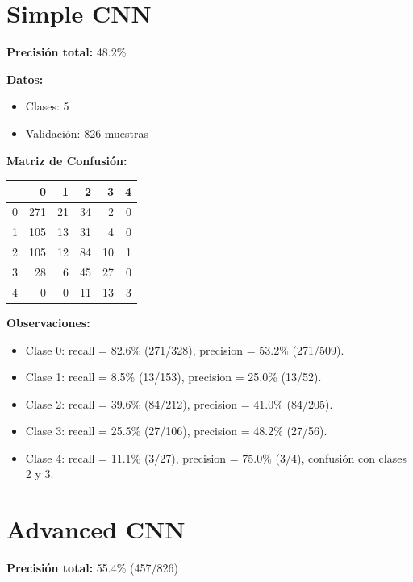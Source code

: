 \documentclass[11pt,spanish,listoffigures,listoftables]{tfgetsinf}
\begin{document}
\section{Simple CNN}

\textbf{Precisión total:} 48.2\%

\bigskip

\noindent\textbf{Datos:}
\begin{itemize}
  \item Clases: 5
  \item Validación: 826 muestras
\end{itemize}

\medskip

\noindent\textbf{Matriz de Confusión:}
\begin{tabular}{lrrrrr}
    & 0   & 1   & 2   & 3   & 4   \\ \hline
  0 & 271 & 21  & 34  & 2   & 0   \\
  1 & 105 & 13  & 31  & 4   & 0   \\
  2 & 105 & 12  & 84  & 10  & 1   \\
  3 & 28  & 6   & 45  & 27  & 0   \\
  4 & 0   & 0   & 11  & 13  & 3   
\end{tabular}

\bigskip

\noindent\textbf{Observaciones:}
\begin{itemize}
  \item Clase 0: recall = 82.6\% (271/328), precision = 53.2\% (271/509).
  \item Clase 1: recall = 8.5\% (13/153), precision = 25.0\% (13/52).
  \item Clase 2: recall = 39.6\% (84/212), precision = 41.0\% (84/205).
  \item Clase 3: recall = 25.5\% (27/106), precision = 48.2\% (27/56).
  \item Clase 4: recall = 11.1\% (3/27), precision = 75.0\% (3/4), confusión con clases 2 y 3.
\end{itemize}

\section*{Advanced CNN}

\textbf{Precisión total:} 55.4\% (457/826)

\bigskip
\end{document}
